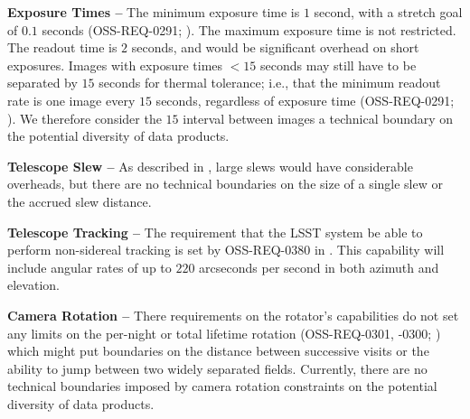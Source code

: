 \documentclass[DM,lsstdoc,toc]{lsstdoc}
\begin{document}
{\bf Exposure Times -- } The minimum exposure time is $1$ second, with a stretch goal of $0.1$ seconds (OSS-REQ-0291; ). The maximum exposure time is not restricted. The readout time is $2$ seconds, and would be significant overhead on short exposures. Images with exposure times $<15$ seconds may still have to be separated by $15$ seconds for thermal tolerance; i.e., that the minimum readout rate is one image every $15$ seconds, regardless of exposure time (OSS-REQ-0291; ). We therefore consider the $15$ interval between images a technical boundary on the potential diversity of data products.

{\bf Telescope Slew -- } As described in , large slews would have considerable overheads, but there are no technical boundaries on the size of a single slew or the accrued slew distance.

{\bf Telescope Tracking --} The requirement that the LSST system be able to perform non-sidereal tracking is set by OSS-REQ-0380 in . This capability will include angular rates of up to $220$ arcseconds per second in both azimuth and elevation. 

{\bf Camera Rotation -- } There requirements on the rotator's capabilities do not set any limits on the per-night or total lifetime rotation (OSS-REQ-0301, -0300; ) which might put boundaries on the distance between successive visits or the ability to jump between two widely separated fields.
Currently, there are no technical boundaries imposed by camera rotation constraints on the potential diversity of data products.


\clearpage
\end{document}
